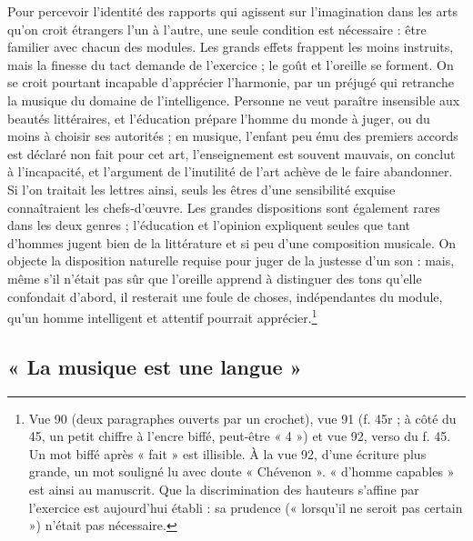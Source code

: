 \documentclass[11pt,a4paper]{article}
\begin{document}
Pour percevoir l'identité des rapports qui agissent sur l'imagination dans les
arts qu'on croit étrangers l'un à l'autre, une seule condition est nécessaire :
être familier avec chacun des modules. Les grands effets frappent les moins
instruits, mais la finesse du tact demande de l'exercice ; le goût et l'oreille
se forment. On se croit pourtant incapable d'apprécier l'harmonie, par un
préjugé qui retranche la musique du domaine de l'intelligence. Personne ne veut
paraître insensible aux beautés littéraires, et l'éducation prépare l'homme du
monde à juger, ou du moins à choisir ses autorités ; en musique, l'enfant peu
ému des premiers accords est déclaré non fait pour cet art, l'enseignement est
souvent mauvais, on conclut à l'incapacité, et l'argument de l'inutilité de l'art
achève de le faire abandonner. Si l'on traitait les lettres ainsi, seuls les
êtres d'une sensibilité exquise connaîtraient les chefs-d'œuvre. Les grandes
dispositions sont également rares dans les deux genres ; l'éducation et
l'opinion expliquent seules que tant d'hommes jugent bien de la littérature et
si peu d'une composition musicale. On objecte la disposition naturelle requise
pour juger de la justesse d'un son : mais, même s'il n'était pas sûr que
l'oreille apprend à distinguer des tons qu'elle confondait d'abord, il resterait
une foule de choses, indépendantes du module, qu'un homme intelligent et attentif
pourrait apprécier.\footnote{Vue 90 (deux paragraphes ouverts par un crochet),
vue 91 (f. 45r ; à côté du 45, un petit chiffre à l'encre biffé, peut-être
« 4 ») et vue 92, verso du f. 45. Un mot biffé après « fait » est illisible. À
la vue 92, d'une écriture plus grande, un mot souligné lu avec doute
« Chévenon ». « d'homme capables » est ainsi au manuscrit. Que la
discrimination des hauteurs s'affine par l'exercice est aujourd'hui établi : sa
prudence (« lorsqu'il ne seroit pas certain ») n'était pas nécessaire.}

\subsection*{« La musique est une langue »}
\end{document}

